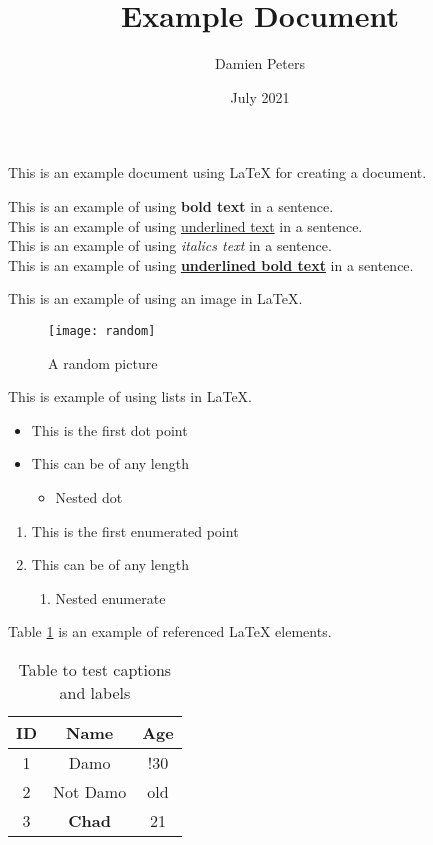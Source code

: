 \documentclass[12pt, letterpaper]{article}
\title{Example Document}
\author{Damien Peters}
\date{July 2021}
\begin{document}
\maketitle

This is an example document using \LaTeX{} for creating a document.



This is an example of using \textbf{bold text} in a sentence.\\
This is an example of using \underline{underlined text} in a sentence.\\
This is an example of using \textit{italics text} in a sentence.\\
This is an example of using \textbf{\underline{underlined bold text}} in a sentence.
\par


This is an example of using an image in \LaTeX{}.

\begin{figure}[h]
	\centering
	\texttt{[image: random]}
	\caption{A random picture}
	\label{fig:random1}
\end{figure}
\par
\newpage

This is example of using lists in \LaTeX{}.

\begin{itemize}
	\item This is the first dot point
	\item This can be of any length
	\begin{itemize}
		\item Nested dot
	\end{itemize}
\end{itemize}

\begin{enumerate}
	\item This is the first enumerated point
	\item This can be of any length
	\begin{enumerate}
		\item Nested enumerate
	\end{enumerate}
\end{enumerate}
\par

Table \ref{table:data} is an example of referenced \LaTeX{} elements.

\begin{table}[h!]
\centering
\begin{tabular}{||c c c||} 
 \hline
 ID & Name & Age \\ [0.5ex] 
 \hline\hline
 1 & Damo & !30 \\ 
 2 & Not Damo & old  \\
 3 & \textbf{Chad} & 21 \\ [1ex] 
 \hline
\end{tabular}
\caption{Table to test captions and labels}
\label{table:data}
\end{table}
\end{document}
